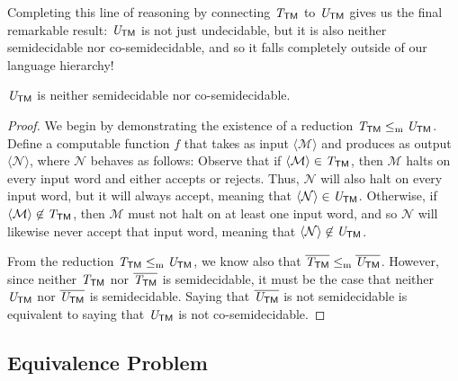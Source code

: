 Completing this line of reasoning by connecting $\mathit{T}_{\textsf{TM}}$ to $\mathit{U}_{\textsf{TM}}$ gives us the final remarkable result: $\mathit{U}_{\textsf{TM}}$ is not just undecidable, but it is also neither semidecidable nor co-semidecidable, and so it falls completely outside of our language hierarchy!

\begin{theorem}\label{thm:UTMnotsemidecidable}
$\mathit{U}_{\textsf{TM}}$ is neither semidecidable nor co-semidecidable.

\begin{proof}
We begin by demonstrating the existence of a reduction $\mathit{T}_{\textsf{TM}} \leq_{\mathrm{m}} \mathit{U}_{\textsf{TM}}$. Define a computable function $f$ that takes as input $\langle \mathcal{M} \rangle$ and produces as output $\langle \mathcal{N} \rangle$, where $\mathcal{N}$ behaves as follows:
Observe that if $\langle \mathcal{M} \rangle \in \mathit{T}_{\textsf{TM}}$, then $\mathcal{M}$ halts on every input word and either accepts or rejects. Thus, $\mathcal{N}$ will also halt on every input word, but it will always accept, meaning that $\langle \mathcal{N} \rangle \in \mathit{U}_{\textsf{TM}}$. Otherwise, if $\langle \mathcal{M} \rangle \not\in \mathit{T}_{\textsf{TM}}$, then $\mathcal{M}$ must not halt on at least one input word, and so $\mathcal{N}$ will likewise never accept that input word, meaning that $\langle \mathcal{N} \rangle \not\in \mathit{U}_{\textsf{TM}}$.

From the reduction $\mathit{T}_{\textsf{TM}} \leq_{\mathrm{m}} \mathit{U}_{\textsf{TM}}$, we know also that $\overline{\mathit{T}_{\textsf{TM}}} \leq_{\mathrm{m}} \overline{\mathit{U}_{\textsf{TM}}}$. However, since neither $\mathit{T}_{\textsf{TM}}$ nor $\overline{\mathit{T}_{\textsf{TM}}}$ is semidecidable, it must be the case that neither $\mathit{U}_{\textsf{TM}}$ nor $\overline{\mathit{U}_{\textsf{TM}}}$ is semidecidable. Saying that $\overline{\mathit{U}_{\textsf{TM}}}$ is not semidecidable is equivalent to saying that $\mathit{U}_{\textsf{TM}}$ is not co-semidecidable.
\end{proof}
\end{theorem}

\subsection*{Equivalence Problem}

